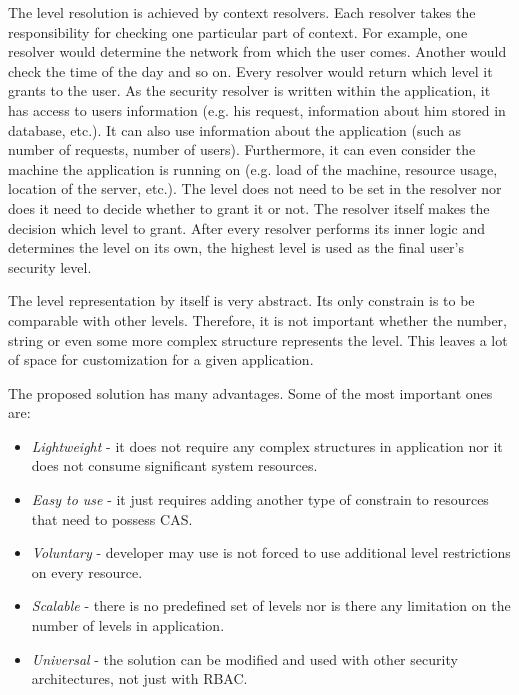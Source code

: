 \documentclass{sig-alternate-05-2015}
\begin{document}
The level resolution is achieved by context resolvers. Each resolver takes the responsibility for checking one particular part of context. For example, one resolver would determine the network from which the user comes. Another would check the time of the day and so on. Every resolver would return which level it grants to the user. As the security resolver is written within the application, it has access to users information (e.g. his request, information about him stored in database, etc.). It can also use information about the application (such as number of requests, number of users). Furthermore, it can even consider the machine the application is running on (e.g. load of the machine, resource usage, location of the server, etc.). The level does not need to be set in the resolver nor does it need to decide whether to grant it or not. The resolver itself makes the decision which level to grant. After every resolver performs its inner logic and determines the level on its own, the highest level is used as the final user's security level.

The level representation by itself is very abstract. Its only constrain is to be comparable with other levels. Therefore, it is not important whether the number, string or even some more complex structure represents the level. This leaves a lot of space for customization for a given application.

The proposed solution has many advantages. Some of the most important ones are:

\begin{itemize}  
\setlength{\itemsep}{1pt}
	 \setlength{\parskip}{0pt}
  \setlength{\parsep}{0pt}
  \item {\em Lightweight} - it does not require any complex structures in application nor it does not consume significant system resources. 
  \item {\em Easy to use} - it just requires adding another type of constrain to resources that need to possess CAS.
  
  \item {\em Voluntary} - developer may use is not forced to use additional level restrictions on every resource.
  
  \item {\em Scalable} - there is no predefined set of levels nor is there any limitation on the number of levels in application.
  
  \item {\em Universal} - the solution can be modified and used with other security architectures, not just with RBAC.
\end{itemize}
\end{document}
